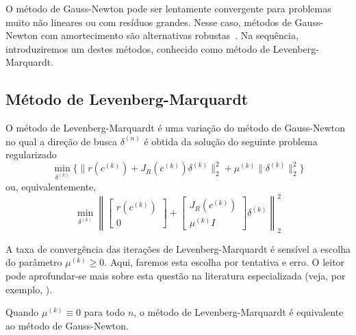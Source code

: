 O método de Gauss-Newton pode ser lentamente convergente para problemas muito não lineares ou com resíduos grandes. Nesse caso, métodos de Gauss-Newton com amortecimento são alternativas robustas~\cite{Bjorck1996a,Nocedal2006a}. Na sequência, introduziremos um destes métodos, conhecido como método de Levenberg-Marquardt.

\subsection{Método de Levenberg-Marquardt}
\badgeRevisar

O método de Levenberg-Marquardt é uma variação do método de Gauss-Newton no qual a direção de busca $\delta^{(n)}$ é obtida da solução do seguinte problema regularizado
\begin{equation} \label{eq:mq_gn0}
  \min_{\delta^{(k)}} \{\|r(c^{(k)}) + J_R(c^{(k)})\delta^{(k)}\|_2^2 + \mu^{(k)}\|\delta^{(k)}\|_2^2\}
\end{equation}
ou, equivalentemente,
\begin{equation} \label{eq:mq_gn0}
  \min_{\delta^{(k)}} \left\|
    \begin{bmatrix}
      r(c^{(k)})\\
      0
    \end{bmatrix} +
    \begin{bmatrix}
      J_R(c^{(k)})\\
      \mu^{(k)}I
    \end{bmatrix}
    \delta^{(k)}\right\|_2^2
\end{equation}

A taxa de convergência das iterações de Levenberg-Marquardt é sensível a escolha do parâmetro $\mu^{(k)}\geq 0$. Aqui, faremos esta escolha por tentativa e erro. O leitor pode aprofundar-se mais sobre esta questão na literatura especializada (veja, por exemplo, \cite{Bjorck1996a,Nocedal2006a}).

\begin{obs}
  Quando $\mu^{(k)} \equiv 0$ para todo $n$, o método de Levenberg-Marquardt é equivalente ao método de Gauss-Newton.
\end{obs}

